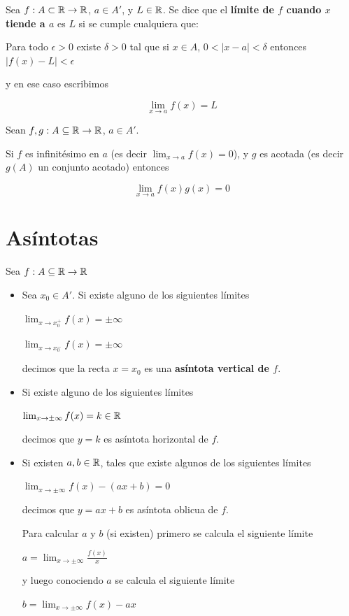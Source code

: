 \begin{definition}[Límite] \label{limite_r}
Sea $f : A \subset \mathbb{R} \to \mathbb{R}$, $ a \in A'$, y $L \in \mathbb{R}$.  Se dice que el \textbf{límite de $f$ cuando $x$ tiende a $a$}  es $L$ si se cumple cualquiera que:

Para todo $\epsilon > 0$ existe $\delta > 0$ tal que si $x \in A$, $0 < |x-a| < \delta$ entonces $|f(x) - L| < \epsilon$

y en ese caso escribimos

$$ \displaystyle \lim_{x \to a} f(x) = L $$
\end{definition}


\begin{theorem} \label{cero_por_acotada}
Sean $f,g:A \subseteq \mathbb{R} \to \mathbb{R}$, $a \in A'$.

Si $f$ es infinitésimo en $a$ (es decir $ \lim_{x \to a} f(x) = 0$), y $g$ es acotada (es decir $g(A)$ un conjunto acotado) entonces

$$ \lim_{x \to a} f(x)g(x) = 0 $$
\end{theorem}


\section{Asíntotas}


\begin{definition}[Asíntotas]
Sea $f: A \subseteq \mathbb{R} \to \mathbb{R}$

\begin{itemize}
\item Sea $x_0 \in A'$.  Si existe alguno de los siguientes límites 

$\lim_{x \to x_0^+} f(x) = \pm \infty$

$\lim_{x \to x_0^-} f(x) = \pm \infty$

decimos que la recta $x = x_0$ es una \textbf{asíntota vertical de $f$}.


\item Si existe alguno de los siguientes límites 

$\lim_{x \to \pm \infty} f(x) = k \in \mathbb{R}$ 

decimos que $y = k$ es asíntota horizontal de $f$.


\item Si existen $a,b \in \mathbb{R}$, tales que existe algunos de los siguientes límites

$\lim_{x \to \pm \infty} f(x) - (ax+b) = 0$ 

decimos que $y = ax+b$ es asíntota oblicua de $f$.

Para calcular $a$ y $b$ (si existen) primero se calcula el siguiente límite

$ a = \lim_{x \to \pm \infty} \frac{f(x)}{x} $

y luego conociendo $a$ se calcula el siguiente límite

$ b = \lim_{x \to \pm \infty} f(x) - ax $
\end{itemize}
\end{definition}


